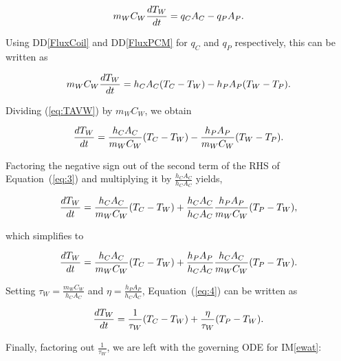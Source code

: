 \documentclass[12pt]{article}
\newcommand{\ddref}[1]{DD\ref{#1}}
\newcommand{\iref}[1]{IM\ref{#1}}
\begin{document}
\begin{equation*}
\\m_W C_W \frac{dT_W}{dt} = q_C A_C - q_P A_P.
\end{equation*}

\noindent
Using \ddref{FluxCoil} and \ddref{FluxPCM} for $q_C$ and $q_P$ respectively,
this can be written as

\begin{equation}
\\m_W C_W \frac{dT_W}{dt} = h_C A_C (T_C - T_W) - h_P A_P (T_W - T_P). \label{eq:TAVW}
\end{equation}

\noindent
Dividing (\ref{eq:TAVW}) by $m_W C_W$, we obtain

\begin{equation}
\\ \frac{dT_W}{dt} = \frac{h_C A_C}{m_W C_W} (T_C - T_W) - 
\frac{h_P A_P}{m_WC_W} (T_W - T_P).\label{eq:3}
\end{equation}

\noindent

Factoring the negative sign out of the second term of the RHS of
Equation~(\ref{eq:3}) and multiplying it by $\frac{h_C A_C}{h_C A_C}$ yields,

\begin{equation*}
\\ \frac{dT_W}{dt} = \frac{h_C A_C}{m_W C_W} (T_C - T_W) + 
\frac{h_C A_C}{h_C A_C} \frac{h_P A_P}{m_WC_W} (T_P - T_W),
\end{equation*}

\noindent
which simplifies to

\begin{equation}
\\ \frac{dT_W}{dt} = \frac{h_C A_C}{m_W C_W} (T_C - T_W) + 
\frac{h_P A_P}{h_C A_C} \frac{h_C A_C}{m_WC_W} (T_P - T_W).\label{eq:4}
\end{equation}

\noindent
Setting $\tau_W = \frac{m_W C_W}{h_C A_C}$ and $\eta = \frac{h_P A_P}{h_C A_C}$, 
Equation~(\ref{eq:4}) can be written as

\begin{equation*}
\\ \frac{dT_W}{dt} = \frac{1}{\tau_W} (T_C - T_W) + 
\frac{\eta}{\tau_W}(T_P - T_W).
\end{equation*}

\noindent
Finally, factoring out $\frac{1}{\tau_W}$, we are left with the governing ODE for \iref{ewat}:
\end{document}

